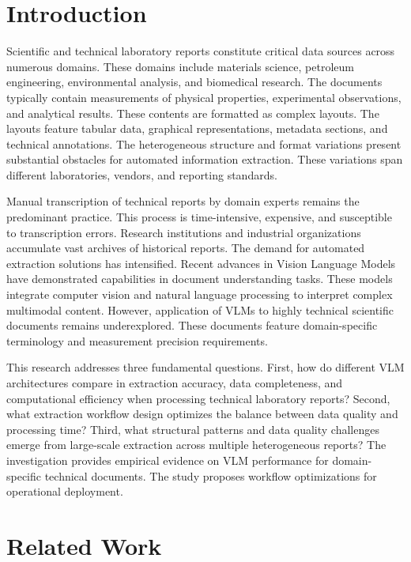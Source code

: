 \documentclass{svproc}
\begin{document}
\section{Introduction}

Scientific and technical laboratory reports constitute critical data sources across numerous domains. These domains include materials science, petroleum engineering, environmental analysis, and biomedical research. The documents typically contain measurements of physical properties, experimental observations, and analytical results. These contents are formatted as complex layouts. The layouts feature tabular data, graphical representations, metadata sections, and technical annotations. The heterogeneous structure and format variations present substantial obstacles for automated information extraction. These variations span different laboratories, vendors, and reporting standards.

Manual transcription of technical reports by domain experts remains the predominant practice. This process is time-intensive, expensive, and susceptible to transcription errors. Research institutions and industrial organizations accumulate vast archives of historical reports. The demand for automated extraction solutions has intensified. Recent advances in Vision Language Models have demonstrated capabilities in document understanding tasks. These models integrate computer vision and natural language processing to interpret complex multimodal content. However, application of VLMs to highly technical scientific documents remains underexplored. These documents feature domain-specific terminology and measurement precision requirements.

This research addresses three fundamental questions. First, how do different VLM architectures compare in extraction accuracy, data completeness, and computational efficiency when processing technical laboratory reports? Second, what extraction workflow design optimizes the balance between data quality and processing time? Third, what structural patterns and data quality challenges emerge from large-scale extraction across multiple heterogeneous reports? The investigation provides empirical evidence on VLM performance for domain-specific technical documents. The study proposes workflow optimizations for operational deployment.

\section{Related Work}
\end{document}
